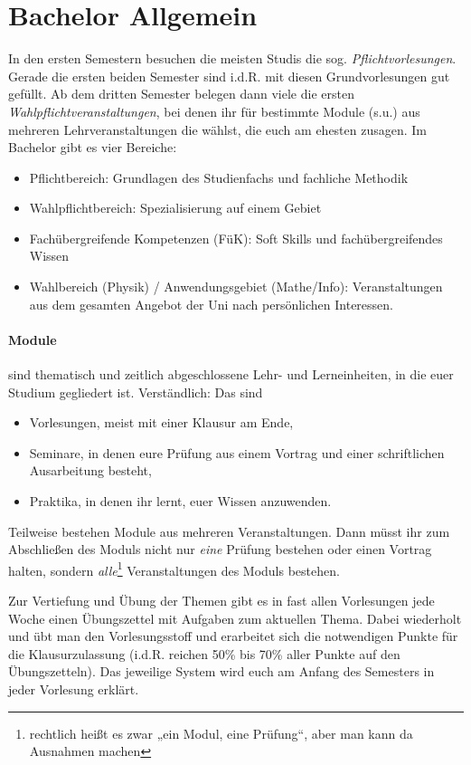\section{Bachelor Allgemein}
In den ersten Semestern besuchen die meisten Studis die sog. \emph{Pflichtvorlesungen}. Gerade die ersten beiden Semester sind i.d.R. mit diesen Grundvorlesungen gut gefüllt. Ab dem dritten Semester belegen dann viele die ersten \emph{Wahlpflichtveranstaltungen}, bei denen ihr für bestimmte Module (s.u.) aus mehreren Lehrveranstaltungen die wählst, die euch am ehesten zusagen. Im Bachelor gibt es vier Bereiche:

\begin{itemize}
	\item Pflichtbereich: Grundlagen des Studienfachs und fachliche Methodik
	\item Wahlpflichtbereich: Spezialisierung auf einem Gebiet
	\item Fachübergreifende Kompetenzen (FüK): Soft Skills und fachübergreifendes Wissen
	\item Wahlbereich (Physik) / Anwendungsgebiet (Mathe/Info): Veranstaltungen aus dem gesamten Angebot der Uni nach persönlichen Interessen.
\end{itemize}

\paragraph*{Module} sind \glqq{}thematisch und zeitlich abgeschlossene Lehr- und Lerneinheiten\grqq{}, in die euer Studium gegliedert ist. Verständlich: Das sind

\begin{itemize}
	\item Vorlesungen, meist mit einer Klausur am Ende,
	\item Seminare, in denen eure Prüfung aus einem Vortrag und einer schriftlichen Ausarbeitung besteht,
	\item Praktika, in denen ihr lernt, euer Wissen anzuwenden.
\end{itemize}

Teilweise bestehen Module aus mehreren Veranstaltungen. Dann müsst ihr zum Abschließen des Moduls nicht nur \textit{eine} Prüfung bestehen oder einen Vortrag halten, sondern \textit{alle}\footnote{rechtlich heißt es zwar „ein Modul, eine Prüfung“, aber man kann da Ausnahmen machen} Veranstaltungen des Moduls bestehen.

Zur Vertiefung und Übung der Themen gibt es in fast allen Vorlesungen jede Woche einen Übungszettel mit Aufgaben zum aktuellen Thema. Dabei wiederholt und übt man den Vorlesungsstoff und erarbeitet sich die notwendigen Punkte für die Klausurzulassung (i.d.R. reichen 50\% bis 70\% aller Punkte auf den Übungszetteln). Das jeweilige System wird euch am Anfang des Semesters in jeder Vorlesung erklärt.

